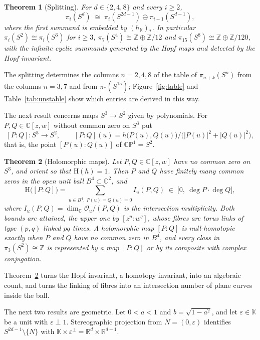 \documentclass[11pt]{amsart}
\numberwithin{equation}{section}
\theoremstyle{plain}
\newtheorem{maintheorem}{Theorem}
\theoremstyle{definition}
\theoremstyle{remark}
\newcommand{\R}{\mathbb{R}}
\newcommand{\C}{\mathbb{C}}
\newcommand{\K}{\mathbb{K}}
\newcommand{\Z}{\mathbb{Z}}
\newcommand{\CP}{\mathbb{CP}}
\newcommand{\Hopf}{\mathrm{H}}
\begin{document}
\begin{maintheorem}[Splitting]\label{thm:C}
For $d\in\{2,4,8\}$ and every $i\ge2$,
\[
\pi_i(S^d)\;\cong\;\pi_i(S^{2d-1})\oplus\pi_{i-1}(S^{d-1}),
\]
where the first summand is embedded by $(h_\K)_*$. In particular $\pi_i(S^2)\cong\pi_i(S^3)$ for $i\ge3$, $\pi_7(S^4)\cong\Z\oplus\Z/12$ and $\pi_{15}(S^8)\cong\Z\oplus\Z/120$, with the infinite cyclic summands generated by the Hopf maps and detected by the Hopf invariant.
\end{maintheorem}

The splitting determines the columns $n=2,4,8$ of the table of $\pi_{n+k}(S^n)$ from the columns $n=3,7$ and from $\pi_*(S^{15})$; Figure~\ref{fig:table} and Table~\ref{tab:unstable} show which entries are derived in this way.

The next result concerns maps $S^3\to S^2$ given by polynomials. For $P,Q\in\C[z,w]$ without common zero on $S^3$ put
\[
[P:Q]\colon S^3\to S^2,\qquad [P:Q](u)=h\bigl(P(u),Q(u)\bigr)\big/\bigl(|P(u)|^2+|Q(u)|^2\bigr),
\]
that is, the point $[P(u):Q(u)]$ of $\CP^1=S^2$.

\begin{maintheorem}[Holomorphic maps]\label{thm:D}
Let $P,Q\in\C[z,w]$ have no common zero on $S^3$, and orient so that $\Hopf(h)=1$. Then $P$ and $Q$ have finitely many common zeros in the open unit ball $B^4\subset\C^2$, and
\[
\Hopf\bigl([P:Q]\bigr)=\sum_{u\in B^4,\ P(u)=Q(u)=0} I_u(P,Q)\;\in\;\bigl[0,\ \deg P\cdot\deg Q\bigr],
\]
where $I_u(P,Q)=\dim_\C\mathcal O_u/(P,Q)$ is the intersection multiplicity. Both bounds are attained, the upper one by $[z^p:w^q]$, whose fibres are torus links of type $(p,q)$ linked $pq$ times. A holomorphic map $[P:Q]$ is null-homotopic exactly when $P$ and $Q$ have no common zero in $B^4$, and every class in $\pi_3(S^2)\cong\Z$ is represented by a map $[P:Q]$ or by its composite with complex conjugation.
\end{maintheorem}

Theorem~\ref{thm:D} turns the Hopf invariant, a homotopy invariant, into an algebraic count, and turns the linking of fibres into an intersection number of plane curves inside the ball.

The next two results are geometric. Let $0<a<1$ and $b=\sqrt{1-a^2}$, and let $\varepsilon\in\K$ be a unit with $\varepsilon\perp1$. Stereographic projection from $N=(0,\varepsilon)$ identifies $S^{2d-1}\setminus\{N\}$ with $\K\times\varepsilon^\perp=\R^d\times\R^{d-1}$.
\end{document}
